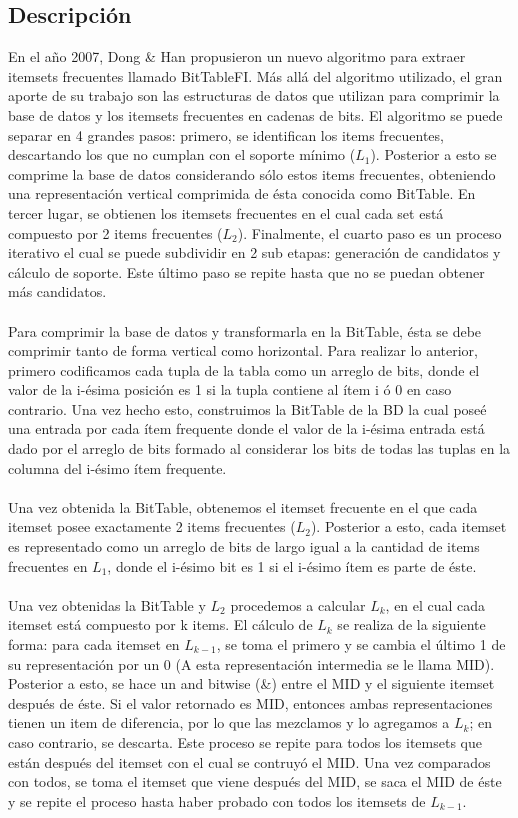 \documentclass[12pt,spanish]{article}
\begin{document}
\subsection{Descripción}

En el año 2007, Dong \& Han propusieron un nuevo algoritmo para extraer itemsets frecuentes llamado BitTableFI. Más allá del algoritmo utilizado, el gran aporte de su trabajo son las estructuras de datos que utilizan para comprimir la base de datos y los itemsets frecuentes en cadenas de bits. El algoritmo se puede separar en 4 grandes pasos: primero, se identifican los items frecuentes, descartando los que no cumplan con el soporte mínimo ($L_1$). Posterior a esto se comprime la base de datos considerando sólo estos items frecuentes, obteniendo una representación vertical comprimida de ésta conocida como BitTable. En tercer lugar, se obtienen los itemsets frecuentes en el cual cada set está compuesto por 2 items frecuentes ($L_2$). Finalmente, el cuarto paso es un proceso iterativo el cual se puede subdividir en 2 sub etapas: generación de candidatos y cálculo de soporte. Este último paso se repite hasta que no se puedan obtener más candidatos.
\\\\
Para comprimir la base de datos y transformarla en la BitTable, ésta se debe comprimir tanto de forma vertical como horizontal. Para realizar lo anterior, primero codificamos cada tupla de la tabla como un arreglo de bits, donde el valor de la i-ésima posición es 1 si la tupla contiene al ítem i ó 0 en caso contrario. Una vez hecho esto, construimos la BitTable de la BD la cual poseé una entrada por cada ítem frequente donde el valor de la i-ésima entrada está dado por el arreglo de bits formado al considerar los bits de todas las tuplas en la columna del i-ésimo ítem frequente.
\\\\
Una vez obtenida la BitTable, obtenemos el itemset frecuente en el que cada itemset posee exactamente 2 items frecuentes ($L_2$). Posterior a esto, cada itemset es representado como un arreglo de bits de largo igual a la cantidad de items frecuentes en $L_1$, donde el i-ésimo bit es 1 si el i-ésimo ítem es parte de éste.
\\\\
Una vez obtenidas la BitTable y $L_2$ procedemos a calcular $L_k$, en el cual cada itemset está compuesto por k items. El cálculo de $L_k$ se realiza de la siguiente forma: para cada itemset en $L_{k-1}$, se toma el primero y se cambia el último 1 de su representación por un 0 (A esta representación intermedia se le llama MID). Posterior a esto, se hace un and bitwise (\&) entre el MID y el siguiente itemset después de éste. Si el valor retornado es MID, entonces ambas representaciones tienen un item de diferencia, por lo que las mezclamos y lo agregamos a $L_k$; en caso contrario, se descarta. Este proceso se repite para todos los itemsets que están después del itemset con el cual se contruyó el MID. Una vez comparados con todos, se toma el itemset que viene después del MID, se saca el MID de éste y se repite el proceso hasta haber probado con todos los itemsets de $L_{k-1}$.
\end{document}
